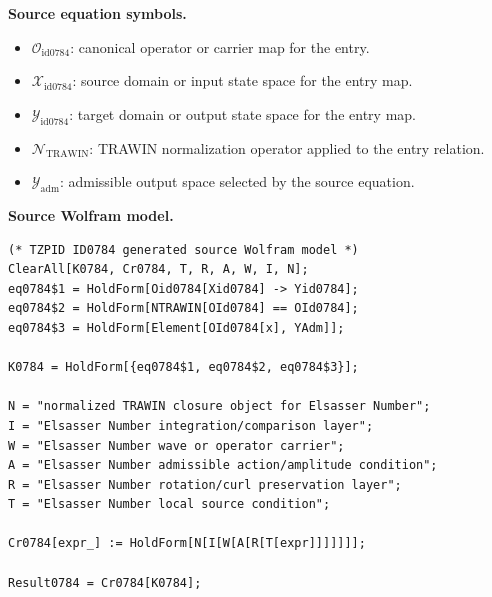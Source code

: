 \begin{minipage}[t]{0.49\linewidth}
\begingroup
\small
\raggedright
\textbf{Source equation symbols.}\par
\begin{itemize}[leftmargin=1.35em,itemsep=1pt,topsep=1pt,parsep=0pt]
    \item $\mathcal{O}_{\mathrm{id0784}}$: canonical operator or carrier map for the entry.
    \item $\mathcal{X}_{\mathrm{id0784}}$: source domain or input state space for the entry map.
    \item $\mathcal{Y}_{\mathrm{id0784}}$: target domain or output state space for the entry map.
    \item $\mathcal{N}_{\mathrm{TRAWIN}}$: TRAWIN normalization operator applied to the entry relation.
    \item $\mathcal{Y}_{\mathrm{adm}}$: admissible output space selected by the source equation.
\end{itemize}
\endgroup
\end{minipage}\hfill
\begin{minipage}[t]{0.47\linewidth}
\begingroup
\scriptsize
\raggedright
\textbf{Source Wolfram model.}\par
\begin{Verbatim}[fontsize=\tiny,breaklines=true,breakanywhere=true]
(* TZPID ID0784 generated source Wolfram model *)
ClearAll[K0784, Cr0784, T, R, A, W, I, N];
eq0784$1 = HoldForm[Oid0784[Xid0784] -> Yid0784];
eq0784$2 = HoldForm[NTRAWIN[OId0784] == OId0784];
eq0784$3 = HoldForm[Element[OId0784[x], YAdm]];

K0784 = HoldForm[{eq0784$1, eq0784$2, eq0784$3}];

N = "normalized TRAWIN closure object for Elsasser Number";
I = "Elsasser Number integration/comparison layer";
W = "Elsasser Number wave or operator carrier";
A = "Elsasser Number admissible action/amplitude condition";
R = "Elsasser Number rotation/curl preservation layer";
T = "Elsasser Number local source condition";

Cr0784[expr_] := HoldForm[N[I[W[A[R[T[expr]]]]]]];

Result0784 = Cr0784[K0784];
\end{Verbatim}
\endgroup
\end{minipage}

